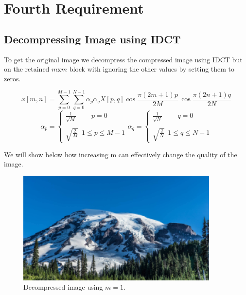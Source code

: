 \chapter{Fourth Requirement}
\section{Decompressing Image using IDCT}
To get the original image we decompress the compressed image using IDCT but on the retained $m$x$m$ block with ignoring the other values by setting them to zeros.

\begin{tcolorbox}[colback=green!8!white,colframe=green!40!black,title=\textbf{Inverse Discrete Cosines Transform}]
    $$x\left[m,n\right] =  \sum_{p=0}^{M-1}\sum_{q=0}^{N-1}\alpha_p \alpha_q X[p,q] \cos{\frac{\pi \left(2m+1\right)p}{2M}} \, \cos{\frac{\pi \left(2n+1\right)q}{2N}}$$
    $$\alpha_p = \begin{cases}
        \frac{1}{\sqrt{M}}\hspace{27pt} p=0 \\\\
        \sqrt{\frac{2}{M}}\,\,\, 1 \leq p \leq M - 1
    \end{cases}
    \alpha_q = \begin{cases}
        \frac{1}{\sqrt{N}}\hspace{27pt} q=0 \\\\
        \sqrt{\frac{2}{N}}\,\,\, 1 \leq q \leq N - 1
    \end{cases}
    $$
\end{tcolorbox}
\vspace{5pt}

\noindent We will show below how increasing m can effectively change the quality of the image.

\begin{figure}[h]
    \centering
    \includegraphics[width=0.9\textwidth]{../Decompressed Images/decompressedImage_m1.png}
    \caption{Decompressed image using $m=1$.}
    \label{fig:decompressed_img_m1}
\end{figure}

